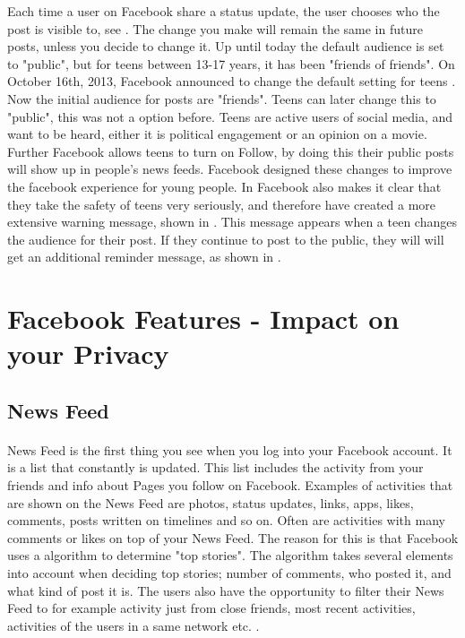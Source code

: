 Each time a user on Facebook share a status update, the user chooses who the post is visible to, see . The change you make will remain the same in future posts, unless you decide to change it. Up until today the default audience is set to "public", but for teens between 13-17 years, it has been "friends of friends". On October 16th, 2013, Facebook announced to change the default setting for teens \cite{defaultTeens}. Now the initial audience for posts are "friends". Teens can later change this to "public", this was not a option before. Teens are active users of social media, and want to be heard, either it is political engagement or an opinion on a movie. Further Facebook allows teens to turn on Follow, by doing this their public posts will show up in people's news feeds. Facebook designed these changes to improve the facebook experience for young people. In \cite{defaultTeens} Facebook also makes it clear that they take the safety of teens very seriously, and therefore have created a more extensive warning message, shown in  . This message appears when a teen changes the audience for their post. If they continue to post to the public, they will will get an additional reminder message, as shown in  .

\section{Facebook Features - Impact on your Privacy}\label{sec:facebook_features}

\subsection{News Feed}
\paragraph{}
News Feed is the first thing you see when you log into your Facebook account. It is a list that constantly is updated. This list includes the activity from your friends and info about Pages you follow on Facebook. Examples of activities that are shown on the News Feed are photos, status updates, links, apps, likes, comments, posts written on timelines and so on. Often are activities with many comments or likes on top of your News Feed. The reason for this is that Facebook uses a algorithm to determine "top stories". The algorithm takes several elements into account when deciding top stories; number of comments, who posted it, and what kind of post it is. The users also have the opportunity to filter their News Feed to for example activity just from close friends, most recent activities, activities of the users in a same network etc. \cite{newsfeed}.

